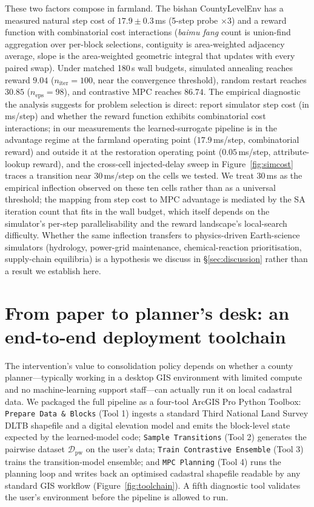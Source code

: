 \documentclass[11pt]{article}
\begin{document}
These two factors compose in farmland. The bishan CountyLevelEnv has a measured natural step cost of $17.9 \pm 0.3$\,ms (5-step probe $\times 3$) and a reward function with combinatorial cost interactions (\textit{baimu fang} count is union-find aggregation over per-block selections, contiguity is area-weighted adjacency average, slope is the area-weighted geometric integral that updates with every paired swap). Under matched 180\,s wall budgets, simulated annealing reaches reward $9.04$ ($n_{\text{iter}}=100$, near the convergence threshold), random restart reaches $30.85$ ($n_{\text{eps}}=98$), and contrastive MPC reaches $86.74$. The empirical diagnostic the analysis suggests for problem selection is direct: report simulator step cost (in ms/step) and whether the reward function exhibits combinatorial cost interactions; in our measurements the learned-surrogate pipeline is in the advantage regime at the farmland operating point ($17.9$\,ms/step, combinatorial reward) and outside it at the restoration operating point ($0.05$\,ms/step, attribute-lookup reward), and the cross-cell injected-delay sweep in Figure~\ref{fig:simcost} traces a transition near $30$\,ms/step on the cells we tested. We treat $30$\,ms as the empirical inflection observed on these ten cells rather than as a universal threshold; the mapping from step cost to MPC advantage is mediated by the SA iteration count that fits in the wall budget, which itself depends on the simulator's per-step parallelisability and the reward landscape's local-search difficulty. Whether the same inflection transfers to physics-driven Earth-science simulators (hydrology, power-grid maintenance, chemical-reaction prioritisation, supply-chain equilibria) is a hypothesis we discuss in \S\ref{sec:discussion} rather than a result we establish here.

\section{From paper to planner's desk: an end-to-end deployment toolchain}\label{sec:deploy}

The intervention's value to consolidation policy depends on whether a county planner---typically working in a desktop GIS environment with limited compute and no machine-learning support staff---can actually run it on local cadastral data. We packaged the full pipeline as a four-tool ArcGIS Pro Python Toolbox: \texttt{Prepare Data \& Blocks} (Tool 1) ingests a standard Third National Land Survey DLTB shapefile and a digital elevation model and emits the block-level state expected by the learned-model code; \texttt{Sample Transitions} (Tool 2) generates the pairwise dataset $\mathcal{D}_{\text{pw}}$ on the user's data; \texttt{Train Contrastive Ensemble} (Tool 3) trains the transition-model ensemble; and \texttt{MPC Planning} (Tool 4) runs the planning loop and writes back an optimised cadastral shapefile readable by any standard GIS workflow (Figure~\ref{fig:toolchain}). A fifth diagnostic tool validates the user's environment before the pipeline is allowed to run.
\end{document}

